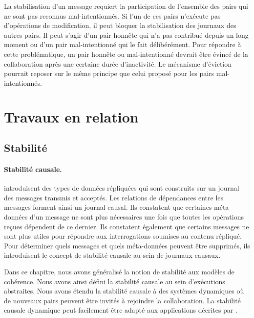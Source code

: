 La stabilisation d'un message requiert la participation de l'ensemble des pairs qui ne sont pas reconnus mal-intentionnés.
Si l'un de ces pairs n'exécute pas d'opérations de modification, il peut bloquer la stabilisation des journaux des autres pairs.
Il peut s'agir d'un pair honnête qui n'a pas contribué depuis un long moment ou d'un pair mal-intentionné qui le fait délibérément.
Pour répondre à cette problématique, un pair honnête ou mal-intentionné devrait être évincé de la collaboration après une certaine durée d'inactivité.
Le mécanisme d'éviction pourrait reposer sur le même principe que celui proposé pour les pairs mal-intentionnés.


\section{Travaux en relation}

\subsection{Stabilité}

\paragraph{Stabilité causale.} \textcite{baquero_2018_pure-op-crdt, baquero_2014_pure-op-crdt} introduisent des types de données répliquées qui sont construits sur un journal des messages transmis et acceptés.
Les relations de dépendances entre les messages forment ainsi un journal causal.
Ils constatent que certaines méta-données d'un message ne sont plus nécessaires une fois que toutes les opérations reçues dépendent de ce dernier.
Ils constatent également que certains messages ne sont plus utiles pour répondre aux interrogations soumises au contenu répliqué.
Pour déterminer quels messages et quels méta-données peuvent être supprimés, ils introduisent le concept de stabilité causale au sein de journaux causaux.

Dans ce chapitre, nous avons généralisé la notion de stabilité aux modèles de cohérence.
Nous avons ainsi défini la stabilité causale au sein d'exécutions abstraites.
Nous avons étendu la stabilité causale à des systèmes dynamiques où de nouveaux pairs peuvent être invités à rejoindre la collaboration.
La stabilité causale dynamique peut facilement être adapté aux applications décrites par \textcite{baquero_2018_pure-op-crdt}.

